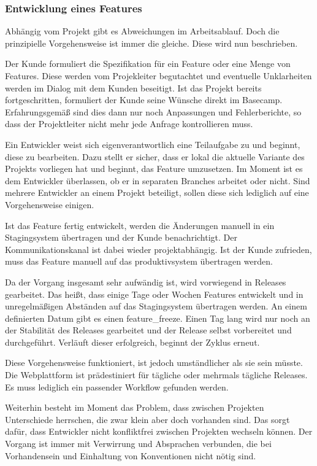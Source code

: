 
\subsubsection{Entwicklung eines Features} %
\label{ssub:entwicklung_eines_features}

Abhängig vom Projekt gibt es Abweichungen im Arbeitsablauf. Doch die prinzipielle Vorgehensweise ist immer die gleiche. Diese wird nun beschrieben.

Der Kunde formuliert die Spezifikation für ein Feature oder eine Menge von Features. Diese werden vom Projekleiter begutachtet und eventuelle Unklarheiten werden im Dialog mit dem Kunden beseitigt. Ist das Projekt bereits fortgeschritten, formuliert der Kunde seine Wünsche direkt im Basecamp. Erfahrungsgemäß sind dies dann nur noch Anpassungen und Fehlerberichte, so dass der Projektleiter nicht mehr jede Anfrage kontrollieren muss.

Ein Entwickler weist sich eigenverantwortlich eine Teilaufgabe zu und beginnt, diese zu bearbeiten. Dazu stellt er sicher, dass er lokal die aktuelle Variante des Projekts vorliegen hat und beginnt, das Feature umzusetzen. Im Moment ist es dem Entwickler überlassen, ob er in separaten Branches arbeitet oder nicht. Sind mehrere Entwickler an einem Projekt beteiligt, sollen diese sich lediglich auf eine Vorgehensweise einigen.

Ist das Feature fertig entwickelt, werden die Änderungen manuell in ein Stagingsystem übertragen und der Kunde benachrichtigt. Der Kommunikationskanal ist dabei wieder projektabhängig. Ist der Kunde zufrieden, muss das Feature manuell auf das \gls{produktivsystem} übertragen werden.

Da der Vorgang insgesamt sehr aufwändig ist, wird vorwiegend in Releases gearbeitet. Das heißt, dass einige Tage oder Wochen Features entwickelt und in unregelmäßigen Abständen auf das Stagingsystem übertragen werden. An einem definierten Datum gibt es einen \gls{feature_freeze}. Einen Tag lang wird nur noch an der Stabilität des Releases gearbeitet und der Release selbst vorbereitet und durchgeführt. Verläuft dieser erfolgreich, beginnt der Zyklus erneut.

Diese Vorgehensweise funktioniert, ist jedoch umständlicher als sie sein müsste. Die Webplattform ist prädestiniert für tägliche oder mehrmals tägliche Releases. Es muss lediglich ein passender Workflow gefunden werden.

Weiterhin besteht im Moment das Problem, dass zwischen Projekten Unterschiede herrschen, die zwar klein aber doch vorhanden sind. Das sorgt dafür, dass Entwickler nicht konfliktfrei zwischen Projekten wechseln können. Der Vorgang ist immer mit Verwirrung und Absprachen verbunden, die bei Vorhandensein und Einhaltung von Konventionen nicht nötig sind.

